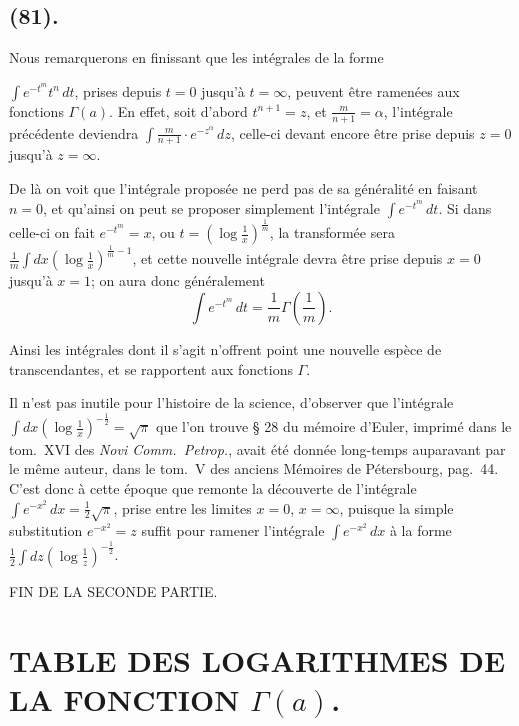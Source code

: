\documentclass{article}
\begin{document}
\subsection*{(81).}

Nous remarquerons en finissant que les intégrales de la forme

$\displaystyle\int e^{-t^{m}}t^{n}\,dt$, prises depuis $t=0$ jusqu'à $t=\infty$, peuvent être ramenées aux fonctions $\Gamma(a)$. En effet, soit d'abord $t^{n+1}=z$, et $\frac{m}{n+1}=\alpha$, l'intégrale précédente deviendra $\displaystyle\int\frac{m}{n+1}\cdot e^{-z^{\alpha}}\,dz$, celle-ci devant encore être prise depuis $z=0$ jusqu'à $z=\infty$.

De là on voit que l'intégrale proposée ne perd pas de sa généralité en faisant $n=0$, et qu'ainsi on peut se proposer simplement l'intégrale $\displaystyle\int e^{-t^{m}}\,dt$. Si dans celle-ci on fait $e^{-t^{m}}=x$, ou $t=\left(\log\frac{1}{x}\right)^{\frac{1}{m}}$, la transformée sera $\displaystyle\frac{1}{m}\int dx\left(\log\frac{1}{x}\right)^{\frac{1}{m}-1}$, et cette nouvelle intégrale devra être prise depuis $x=0$ jusqu'à $x=1$; on aura donc généralement
\[ \int e^{-t^{m}}\,dt=\frac{1}{m}\Gamma\left(\frac{1}{m}\right). \]

Ainsi les intégrales dont il s'agit n'offrent point une nouvelle espèce de transcendantes, et se rapportent aux fonctions $\Gamma$.

Il n'est pas inutile pour l'histoire de la science, d'observer que l'intégrale $\displaystyle\int dx\left(\log\frac{1}{x}\right)^{-\frac{1}{2}}=\sqrt{\pi}$ que l'on trouve § 28 du mémoire d'Euler, imprimé dans le tom.\ XVI des \emph{Novi Comm.\ Petrop.}, avait été donnée long-temps auparavant par le même auteur, dans le tom.\ V des anciens Mémoires de Pétersbourg, pag.\ 44. C'est donc à cette époque que remonte la découverte de l'intégrale $\displaystyle\int e^{-x^{2}}\,dx=\frac{1}{2}\sqrt{\pi}$, prise entre les limites $x=0$, $x=\infty$, puisque la simple substitution $e^{-x^{2}}=z$ suffit pour ramener l'intégrale $\displaystyle\int e^{-x^{2}}\,dx$ à la forme $\displaystyle\frac{1}{2}\int dz\left(\log\frac{1}{z}\right)^{-\frac{1}{2}}$.

FIN DE LA SECONDE PARTIE.


\section*{TABLE DES LOGARITHMES DE LA FONCTION $\Gamma(a)$.}
\end{document}
